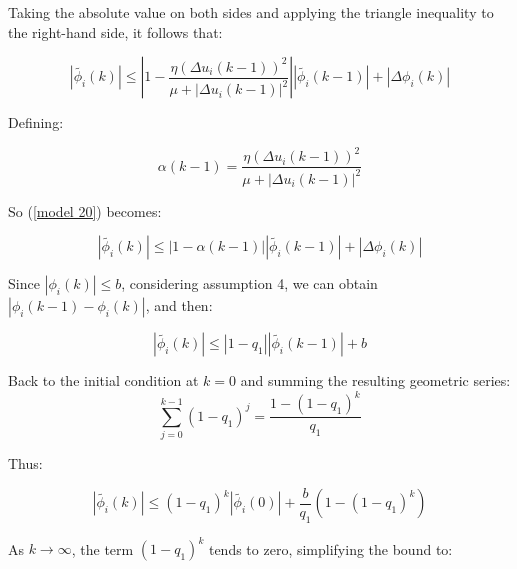 \documentclass[journal,onecolumn]{IEEEtran}
\begin{document}
Taking the absolute value on both sides and applying the triangle inequality to the right-hand side, it follows that:

\begin{equation}
\label{model 20}
|\tilde{\phi_i}(k)| \leq \left| 1 - \frac{\eta (\Delta u_i(k-1))^2}{\mu + |\Delta u_i(k-1)|^2} \right| |\tilde{\phi_i}(k-1)| + |\Delta \phi_i(k)|
\end{equation}

Defining:

\begin{equation}
\label{model 21}
\alpha(k-1) = \frac{\eta (\Delta u_i(k-1))^2}{\mu + |\Delta u_i(k-1)|^2}
\end{equation}

So  (\ref{model 20}) becomes:

\begin{equation}
\label{model 22}
|\tilde{\phi_i}(k)| \leq |1 - \alpha(k-1)| |\tilde{\phi_i}(k-1)| + |\Delta \phi_i(k)|
\end{equation}


Since $|\phi_i(k)| \leq b $, considering assumption 4, we can obtain $|\phi_i(k-1)-\phi_i(k)|$, and then:

\begin{equation}
\label{model 23}
|\tilde{\phi_i}(k)| \leq |1 - q_1| |\tilde{\phi_i}(k-1)| + b
\end{equation}



Back to the initial condition at \(k=0\) and summing the resulting geometric series:
\[
\sum_{j=0}^{k-1} (1-q_1)^j = \frac{1-(1-q_1)^k}{q_1}
\]

Thus:

\begin{equation}
\label{model 25}
|\tilde{\phi_i}(k)| \leq (1 - q_1)^k |\tilde{\phi_i}(0)| + \frac{b}{q_1} (1 - (1 - q_1)^k)
\end{equation}

As \(k \rightarrow \infty\), the term \((1-q_1)^k\) tends to zero, simplifying the bound to:
\end{document}
